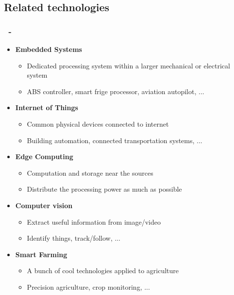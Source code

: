 \documentclass{beamer}
\begin{document}
\subsection{Related technologies}
\begin{frame}
\frametitle{\secname\ - \subsecname}
\begin{itemize}
\item \textbf{Embedded Systems}
\begin{itemize}
    \item Dedicated processing system within a larger mechanical or electrical system
    \item ABS controller, smart frige processor, aviation autopilot, ... 
\end{itemize}
\item \textbf{Internet of Things}
\begin{itemize}
    \item Common physical devices connected to internet
    \item Building automation, connected transportation systems, ...
\end{itemize}
\item \textbf{Edge Computing}
\begin{itemize}
    \item Computation and storage near the sources
    \item Distribute the processing power as much as possible
\end{itemize}
\item \textbf{Computer vision}
\begin{itemize}
    \item Extract useful information from image/video
    \item Identify things, track/follow, ...
\end{itemize}
\item \textbf{Smart Farming}
\begin{itemize}
    \item A bunch of cool technologies applied to agriculture
    \item Precision agriculture, crop monitoring, ...
\end{itemize}
\end{itemize}
\end{frame}
\end{document}
